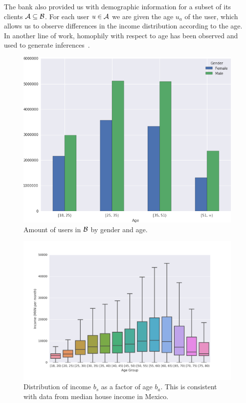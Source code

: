 The bank also provided us with demographic information for a subset of its clients \( \mathcal{A} \subseteq \mathcal{B} \). For each user \( u \in \mathcal{A} \) we are given the age \( u_a \) of the user, which allows us to observe differences in the income distribution according to the age. In another line of work, homophily with respect to age has been observed and used to generate inferences~\cite{brea2014}.

\begin{figure}[h]
\begin{center}
\includegraphics[width=0.8\columnwidth]{figures/gender_age_bar3/gender_age_bar3.png}
\caption{ Amount of users in \( \mathcal{B} \) by gender and age. }
\label{gender_age_bar}
\end{center}
\end{figure}

\begin{figure}[h]
\begin{center}
\includegraphics[width=1\columnwidth]{figures/income_age_boxplot4/income_age_boxplot4.png}
\caption{Distribution of income $b_s$ as a factor of age $b_a$. This is consistent with data from median house income in Mexico\cite{gallup2013}.}
\label{income_age_boxplot}
\end{center}
\end{figure}

